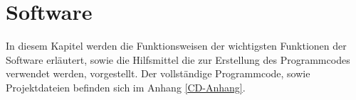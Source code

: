 \newpage
\section{Software}
In diesem Kapitel werden die Funktionsweisen der wichtigsten Funktionen der Software erläutert, sowie die Hilfsmittel die zur Erstellung des Programmcodes verwendet werden, vorgestellt. Der vollständige Programmcode, sowie Projektdateien befinden sich im Anhang \ref{CD-Anhang}.












